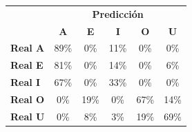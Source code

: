 \begin{tabular}{lccccc}
\toprule
 & \multicolumn{5}{c}{\textbf{Predicción}} \\
 & \textbf{A} & \textbf{E} & \textbf{I} & \textbf{O} & \textbf{U} \\
\midrule
\textbf{Real A} & \cellcolor[rgb]{0.38,0.38,1.00} \color{white} 89\% & \cellcolor[rgb]{1.00,1.00,1.00}  0\% & \cellcolor[rgb]{0.92,0.92,1.00}  11\% & \cellcolor[rgb]{1.00,1.00,1.00}  0\% & \cellcolor[rgb]{1.00,1.00,1.00}  0\% \\
\textbf{Real E} & \cellcolor[rgb]{0.44,0.44,1.00} \color{white} 81\% & \cellcolor[rgb]{1.00,1.00,1.00}  0\% & \cellcolor[rgb]{0.90,0.90,1.00}  14\% & \cellcolor[rgb]{1.00,1.00,1.00}  0\% & \cellcolor[rgb]{0.96,0.96,1.00}  6\% \\
\textbf{Real I} & \cellcolor[rgb]{0.53,0.53,1.00} \color{white} 67\% & \cellcolor[rgb]{1.00,1.00,1.00}  0\% & \cellcolor[rgb]{0.77,0.77,1.00}  33\% & \cellcolor[rgb]{1.00,1.00,1.00}  0\% & \cellcolor[rgb]{1.00,1.00,1.00}  0\% \\
\textbf{Real O} & \cellcolor[rgb]{1.00,1.00,1.00}  0\% & \cellcolor[rgb]{0.86,0.86,1.00}  19\% & \cellcolor[rgb]{1.00,1.00,1.00}  0\% & \cellcolor[rgb]{0.53,0.53,1.00} \color{white} 67\% & \cellcolor[rgb]{0.90,0.90,1.00}  14\% \\
\textbf{Real U} & \cellcolor[rgb]{1.00,1.00,1.00}  0\% & \cellcolor[rgb]{0.94,0.94,1.00}  8\% & \cellcolor[rgb]{0.98,0.98,1.00}  3\% & \cellcolor[rgb]{0.86,0.86,1.00}  19\% & \cellcolor[rgb]{0.51,0.51,1.00} \color{white} 69\% \\
\bottomrule
\end{tabular}